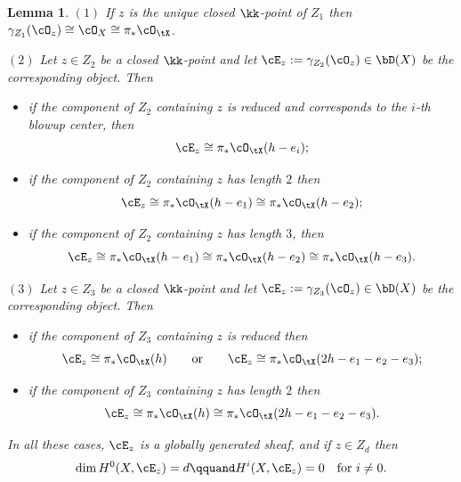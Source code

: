 \documentclass[11pt]{amsart}
\theoremstyle{plain}
\newtheorem{lemma}[theorem]{Lemma}
\theoremstyle{definition}
\theoremstyle{remark}
\begin{document}
\begin{lemma}\label{lemma:e-z-small}
$(1)$ 
If $z$ is the unique closed $\kk$-point of $Z_1$ then $\gamma_{Z_1}(\cO_z) \cong \cO_X \cong \pi_*\cO_\tX$.


\noindent$(2)$
Let $z \in Z_2$ be a closed $\kk$-point and let $\cE_z := \gamma_{Z_2}(\cO_z) \in \bD(X)$ be the corresponding object.
Then
\begin{itemize}
\item[(a)] 
if the component of $Z_2$ containing $z$ is reduced and corresponds to the $i$-th blowup center, then 
\begin{equation*}
\cE_z \cong \pi_*\cO_\tX(h-e_i);
\end{equation*}
\item[(b)] 
if the component of $Z_2$ containing $z$ has length $2$
then 
\begin{equation*}
\cE_z \cong \pi_*\cO_\tX(h-e_1) \cong \pi_*\cO_\tX(h - e_2);
\end{equation*}
\item[(c)] 
if the component of $Z_2$ containing $z$ has length $3$, then
\begin{equation*}
\cE_z \cong \pi_*\cO_\tX(h-e_1) \cong \pi_*\cO_\tX(h - e_2) \cong \pi_*\cO_\tX(h - e_3).
\end{equation*}
\end{itemize}
\noindent$(3)$
Let $z \in Z_3$ be a closed $\kk$-point and let $\cE_z := \gamma_{Z_3}(\cO_z) \in \bD(X)$ be the corresponding object.
Then
\begin{itemize}
\item[(a)] 
if the component of $Z_3$ containing $z$ is reduced then 
\begin{equation*}
\cE_z \cong \pi_*\cO_\tX(h)
\qquad\text{or}\qquad 
\cE_z \cong \pi_*\cO_\tX(2h - e_1 - e_2 - e_3);
\end{equation*}
\item[(b)] 
if the component of $Z_3$ containing $z$ has length $2$ then 
\begin{equation*}
\cE_z \cong \pi_*\cO_\tX(h) \cong \pi_*\cO_\tX(2h - e_1 - e_2 - e_3).
\end{equation*}
\end{itemize}
In all these cases, $\cE_z$ is a globally generated sheaf, and if $z \in Z_d$ then
\begin{equation*}
\dim H^0(X,\cE_z) = d
\qquand
H^{i}(X,\cE_z) = 0
\quad\text{for $i \ne 0$}.
\end{equation*}
\end{lemma}
\end{document}
